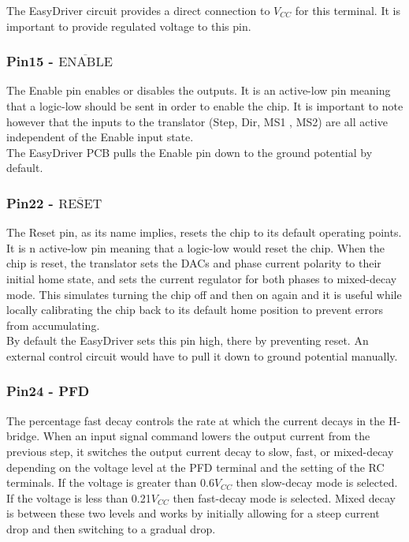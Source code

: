 \documentclass{article}
\theoremstyle{plain}
\theoremstyle{definition}
\theoremstyle{remark}
\begin{document}
The EasyDriver circuit provides a direct connection to $V_{CC}$ for this terminal. It is important to provide regulated voltage to this pin.

\subsubsection*{Pin15 - $\overline{\text{ENABLE}}$}
The Enable pin enables or disables the outputs. It is an active-low pin meaning that a logic-low should be sent in order to enable the chip. It is important to note however that the inputs to the translator (Step, Dir, MS1 , MS2) are all active independent of the Enable input state.\\

The EasyDriver PCB pulls the Enable pin down to the ground potential by default.



\subsubsection*{Pin22 - $\overline{\text{RESET}}$}
The Reset pin, as its name implies, resets the chip to its default operating points. It is n active-low pin meaning that a logic-low would reset the chip. When the chip is reset, the translator sets the DACs and phase current polarity to their initial home state, and sets the current regulator for both phases to mixed-decay mode. This simulates turning the chip off and then on again and it is useful while locally calibrating the chip back to its default home position to prevent errors from accumulating.\\

By default the EasyDriver sets this pin high, there by preventing reset. An external control circuit would have to pull it down to ground potential manually.

\subsubsection*{Pin24 - PFD}
The percentage fast decay controls the rate at which the current decays in the H-bridge. When an input signal command lowers the output current from the previous step, it switches the output current decay to slow, fast, or mixed-decay depending on the voltage level at the PFD terminal and the setting of the RC terminals. If the voltage is greater than 0.6$V_{CC}$ then slow-decay mode is selected.  If the voltage is less than 0.21$V_{CC}$ then fast-decay mode is selected.  Mixed decay is between these two levels and works by initially allowing for a steep current drop and then switching to a gradual drop.\\
\end{document}
